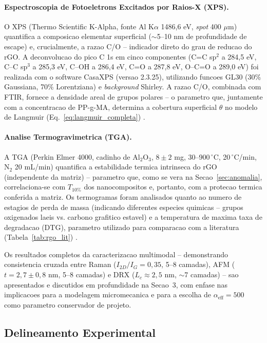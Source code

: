 \documentclass[11pt,a4paper,oneside]{article}
\begin{document}
\paragraph{Espectroscopia de Fotoeletrons Excitados por Raios-X (XPS).} O XPS (Thermo
Scientific K-Alpha, fonte Al K$\alpha$ 1486,6 eV, \textit{spot} 400 $\mu$m) quantifica a
composicao elementar superficial (${\sim}$5--10 nm de profundidade de escape) e, crucialmente,
a razao C/O -- indicador direto do grau de reducao do rGO. A deconvolucao do pico C 1s em cinco
componentes (C=C sp$^2$ a 284,5 eV, C--C sp$^3$ a 285,3 eV, C--OH a 286,4 eV, C=O a 287,8 eV,
O--C=O a 289,0 eV) foi realizada com o software CasaXPS (versao 2.3.25), utilizando funcoes
GL30 (30\% Gaussiana, 70\% Lorentziana) e \textit{background} Shirley. A razao C/O, combinada
com FTIR, fornece a densidade areal de grupos polares -- o parametro que, juntamente com a
concentracao de PP-g-MA, determina a cobertura superficial $\theta$ no modelo de Langmuir
(Eq.~\ref{eq:langmuir_completa}) \cite{Faria2017}.

\paragraph{Analise Termogravimetrica (TGA).} A TGA (Perkin Elmer 4000, cadinho de Al$_2$O$_3$,
$8{\pm}2$ mg, 30--900$\,^{\circ}$C, 20$\,^{\circ}$C/min, N$_2$ 20 mL/min) quantifica a
estabilidade termica intrinseca do rGO (independente da matriz) -- parametro que, como se vera
na Secao~\ref{sec:anomalia}, correlaciona-se com $T_{10\%}$ dos nanocompositos e, portanto, com
a protecao termica conferida a matriz. Os termogramas foram analisados quanto ao numero de
estagios de perda de massa (indicando diferentes especies quimicas -- grupos oxigenados laeis
vs. carbono grafitico estavel) e a temperatura de maxima taxa de degradacao (DTG), parametro
utilizado para comparacao com a literatura (Tabela~\ref{tab:rgo_lit}) \cite{Papageorgiou2017}.

Os resultados completos da caracterizacao multimodal -- demonstrando consistencia cruzada entre
Raman ($I_{2D}/I_G{=}0{,}35$, 5--8 camadas), AFM ($t{=}2{,}7{\pm}0{,}8$ nm, 5--8 camadas) e
DRX ($L_c{\approx}2{,}5$ nm, ${\sim}$7 camadas) -- sao apresentados e discutidos em
profundidade na Secao~3, com enfase nas implicacoes para a modelagem micromecanica e para a
escolha de $\alpha_{\text{eff}}{=}500$ como parametro conservador de projeto.

\subsection{Delineamento Experimental}\label{sec:delineamento}
\end{document}

